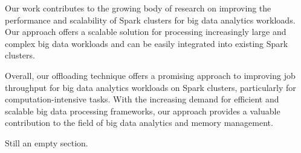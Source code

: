 \documentclass[twocolumn,10pt]{asme2e}
\begin{document}
Our work contributes to the growing body of research on improving the performance and scalability of Spark clusters for big data analytics workloads. Our approach offers a scalable solution for processing increasingly large and complex big data workloads and can be easily integrated into existing Spark clusters.

Overall, our offloading technique offers a promising approach to improving job throughput for big data analytics workloads on Spark clusters, particularly for computation-intensive tasks. With the increasing demand for efficient and scalable big data processing frameworks, our approach provides a valuable contribution to the field of big data analytics and memory management.




\begin{acknowledgment}
	Still an empty section.
\end{acknowledgment}

%



\nocite{*}
\end{document}
